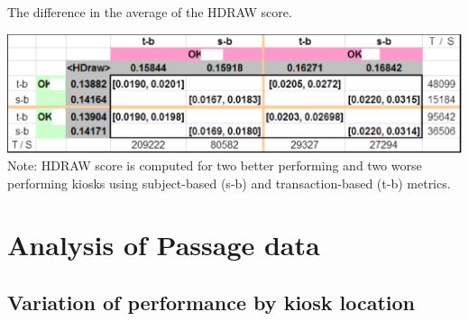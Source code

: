 \documentclass{cta-author}%
\begin{document}







\begin{table}[!b] 
\caption{The difference in the average of the HDRAW score. 
\label{t.kiosks-t-test}}
\scriptsize {
\includegraphics[width=\linewidth]{eps/T-test-kiosks-hidden.eps} 
Note: HDRAW score is computed for two better performing and two worse performing kiosks using  subject-based (s-b) and transaction-based (t-b) metrics. 
}{}
\end{table}






\section{Analysis of Passage data}
\label{s.resultsPA}

\subsection{Variation of performance by kiosk location}
\end{document}
